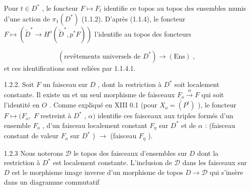 Pour $t \in D^*$ , le foncteur $F \longmapsto F_t$ identifie ce topos au topos des ensembles munis d'une action de $\pi_1(D^*)$ (1.1.2). D'après (1.1.4), le foncteur $F \longmapsto (\widetilde{D}^* \to H^o(\widetilde{D}^*, p^* F))$ l'identifie au topos des foncteurs

\begin{equation*}
(\text{revêtements universels de } D^*) \longrightarrow (\text{Ens}) \;,
\end{equation*}
et ces identifications sont reliées par 1.1.4.1.

1.2.2. Soit $F$ un faisceau sur $D$ , dont la restriction à $D^*$ soit localement constante. Il existe un et un seul morphisme de faisceaux $\underline{F_o} \xrightarrow{\ \alpha\ } F$ qui soit l'identité en $O$ . Comme expliqué en XIII 0.1 (pour $X_o = (P^t)$ ), le foncteur $F \longmapsto (F_o,$ $F$ restreint à $D^*$ , $\alpha)$ identifie ces faisceaux aux triples formés d'un ensemble $F_o$ , d'un faisceau localement constant $F_\eta$ sur $D^*$ et de $\alpha$ : (faisceau constant de valeur $F_o$ sur $D^*$ ) $\longrightarrow$ (faisceau $F_\eta$ ).

1.2.3 Nous noterons $\mathcal{D}$ le topos des faisceaux d'ensembles sur $D$ dont la restriction à $D^*$ est localement constante. L'inclusion de $\mathcal{D}$ dans les faisceaux sur $D$ est le morphisme image inverse d'un morphisme de topos $D \to \mathcal{D}$ qui s'insère dans un diagramme commutatif

